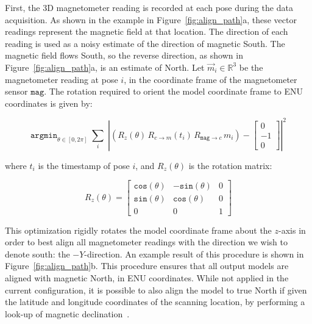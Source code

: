 \documentclass[12pt,onecolumn,oneside]{book}
\begin{document}
First, the 3D magnetometer reading is recorded at each pose during the data acquisition.  As shown in the example in Figure~\ref{fig:align_path}a, these vector readings represent the magnetic field at that location.  The direction of each reading is used as a noisy estimate of the direction of magnetic South.  The magnetic field flows South, so the reverse direction, as shown in Figure~\ref{fig:align_path}a, is an estimate of North.  Let $\vec{m}_i \in \mathbb{R}^3$ be the magnetometer reading at pose $i$, in the coordinate frame of the magnetometer sensor $\texttt{mag}$.  The rotation required to orient the model coordinate frame to ENU coordinates is given by:

\begin{equation}
	\label{eq:align_path}
	\texttt{argmin}_{\theta \in [0,2\pi]} \; \sum \limits_{i} 
		\; \left| \left( R_{z}(\theta) \, R_{c\rightarrow m} (t_i) \,
			R_{\texttt{mag} \rightarrow c} \, m_i \right) - \left[ 
				\begin{array}{c} 0 \\ -1 \\ 0 \end{array} 
					\right] \right|^2
\end{equation}

where $t_i$ is the timestamp of pose $i$, and $R_{z}(\theta)$ is the rotation matrix:

\begin{equation}
	\label{eq:rotation_matrix}
	R_{z}(\theta) = \left[ \begin{array}{ccc}
				\texttt{cos}(\theta) & -\texttt{sin}(\theta) & 0 \\
				\texttt{sin}(\theta) & \texttt{cos}(\theta) & 0 \\
				0 & 0 & 1 \end{array} \right]
\end{equation}

This optimization rigidly rotates the model coordinate frame about the $z$-axis in order to best align all magnetometer readings with the direction we wish to denote south:  the $-Y$-direction.  An example result of this procedure is shown in Figure~\ref{fig:align_path}b.  This procedure ensures that all output models are aligned with magnetic North, in ENU coordinates.  While not applied in the current configuration, it is possible to also align the model to true North if given the latitude and longitude coordinates of the scanning location, by performing a look-up of magnetic declination~\cite{MagDec}.
\end{document}
